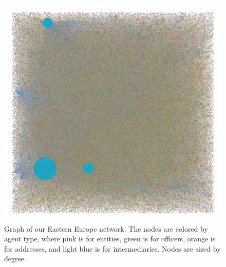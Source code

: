 \documentclass[11pt]{article}
\begin{document}
\begin{figure}[h!]
    \centering
    \includegraphics[width = 5in]{../analysis/figures/easternEuropeNetwork.png}
    \caption{Graph of our Eastern Europe network. The nodes are colored by
        agent type, where pink is for entities, green is for officers,
        orange is for addresses, and light blue is for intermediaries. Nodes
        are sized by degree.}
\end{figure}
\end{document}
